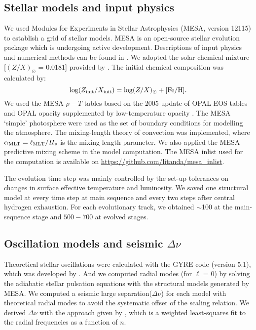 \subsection{Stellar models and input physics}\label{subsec:stellar_model}

We used Modules for Experiments in Stellar Astrophysics
(\textsc{MESA}, version 12115) to establish a grid of stellar models. 
\textsc{MESA} is an open-source stellar evolution package which is undergoing active development. Descriptions of input physics and numerical methods
can be found in \citet{2011ApJS..192....3P,2013ApJS..208....4P, 2015ApJS..220...15P}.
We adopted the solar chemical mixture [$(Z/X)_{\odot}$ = 0.0181]
provided by \citet{2009ARA&A..47..481A}. 
The initial chemical composition was calculated by: 
\begin{equation}
\log (Z_{\rm{init}}/X_{\rm{init}}) = \log (Z/X)_{\odot} + \rm{[Fe/H]}.  \\
\end{equation}
We used the \textsc{MESA} $\rho-T$ tables based on the 2005
update of OPAL EOS tables \citep{2002ApJ...576.1064R} and OPAL opacity
supplemented by low-temperature opacity \citep{2005ApJ...623..585F}. 
The MESA ‘simple’ photosphere were used as the set of boundary conditions for modelling the atmosphere.
The mixing-length theory of convection was implemented, where 
$\alpha_{\rm MLT} = \ell_{\rm MLT}/H_p$ is the mixing-length parameter.
We also applied the \textsc{MESA} predictive mixing scheme \citep{2018ApJS..234...34P,2019ApJS..243...10P}  in the model computation.  The \textsc{MESA} inlist used for the computation is available on \url{https://github.com/litanda/mesa_inlist}.  


The evolution time step was mainly controlled by the set-up tolerances on changes in surface effective temperature and luminosity.
We saved one structural model at every time step at main sequence and every two steps after central hydrogen exhaustion. For each evolutionary track, we obtained $\sim$100 at the main-sequence stage and $500-700$ at evolved stages.  

\subsection{Oscillation models and seismic $\Delta \nu$}\label{subsec:seismo_model}

Theoretical stellar oscillations were calculated with the \textsc{GYRE} code (version 5.1), which was developed by \citet{2013MNRAS.435.3406T}. And we computed radial modes (for $\ell$ = 0) by solving the adiabatic stellar pulsation equations with the structural models generated by \textsc{MESA}. We computed a seismic large separation($\Delta \nu$) for each model with theoretical radial modes to avoid the systematic offset of the scaling relation. We derived $\Delta \nu$ with the approach given by \citet{2011ApJ...743..161W}, which is a weighted least-squares fit to the radial frequencies as a function of $n$.  




